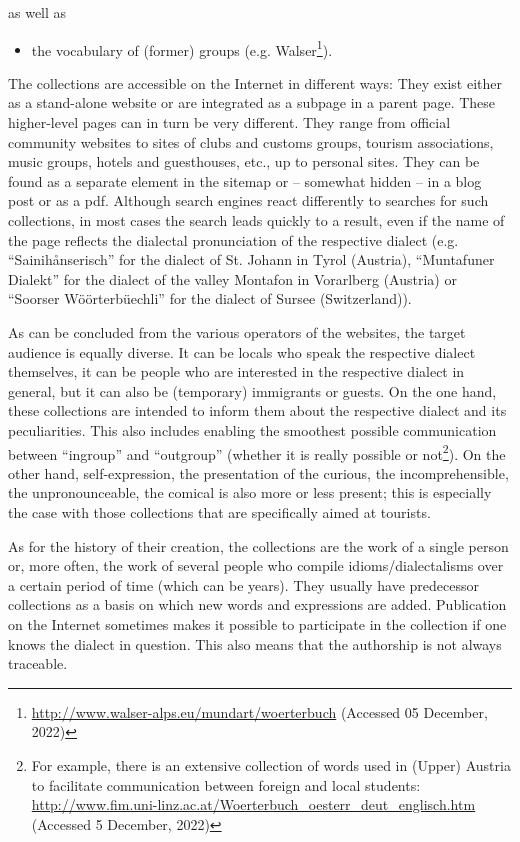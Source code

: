 \documentclass[output=paper]{langscibook}
\begin{document}
as well as
\begin{itemize}
\item the vocabulary of (former) groups (e.g. Walser\footnote{\url{http://www.walser-alps.eu/mundart/woerterbuch} (Accessed 05 December, 2022)}).
\end{itemize}

The collections are accessible on the Internet in different ways: They exist either as a stand-alone website or are integrated as a subpage in a parent page. These higher-level pages can in turn be very different. They range from official community websites to sites of clubs and customs groups, tourism associations, music groups, hotels and guesthouses, etc., up to personal sites. They can be found as a separate element in the sitemap or – somewhat hidden – in a blog post or as a pdf. Although search engines react differently to searches for such collections, in most cases the search leads quickly to a result, even if the name of the page reflects the dialectal pronunciation of the respective dialect (e.g. “Sainihånserisch” for the dialect of St. Johann in Tyrol (Austria), “Muntafuner Dialekt” for the dialect of the valley Montafon in Vorarlberg (Austria) or “Soorser Wöörterbüechli” for the dialect of Sursee (Switzerland)).

As can be concluded from the various operators of the websites, the target audience is equally diverse. It can be locals who speak the respective dialect themselves, it can be people who are interested in the respective dialect in general, but it can also be (temporary) immigrants or guests. On the one hand, these collections are intended to inform them about the respective dialect and its peculiarities. This also includes enabling the smoothest possible communication between “ingroup” and “outgroup” (whether it is really possible or not\footnote{For example, there is an extensive collection of words used in (Upper) Austria to facilitate communication between foreign and local students: \url{http://www.fim.uni-linz.ac.at/Woerterbuch_oesterr_deut_englisch.htm} (Accessed 5 December, 2022)}). On the other hand, self-expression, the presentation of the curious, the incomprehensible, the unpronounceable, the comical is also more or less present; this is especially the case with those collections that are specifically aimed at tourists.

As for the history of their creation, the collections are the work of a single person or, more often, the work of several people who compile idioms/dialectalisms over a certain period of time (which can be years). They usually have predecessor collections as a basis on which new words and expressions are added. Publication on the Internet sometimes makes it possible to participate in the collection if one knows the dialect in question. This also means that the authorship is not always traceable.
\end{document}
